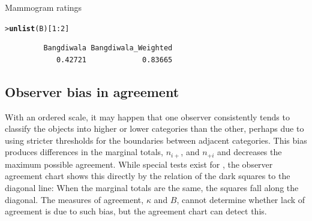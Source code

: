 \documentclass[10pt,krantz2]{krantz}\usepackage[]{graphicx}\usepackage[]{color}
\makeatletter
\newcommand{\hlnum}[1]{\textcolor[rgb]{0.686,0.059,0.569}{#1}}%
\newcommand{\hlopt}[1]{\textcolor[rgb]{0,0,0}{#1}}%
\newcommand{\hlstd}[1]{\textcolor[rgb]{0.345,0.345,0.345}{#1}}%
\newcommand{\hlkwd}[1]{\textcolor[rgb]{0.737,0.353,0.396}{\textbf{#1}}}%
\newenvironment{kframe}{%
 \def\at@end@of@kframe{}%
 \ifinner\ifhmode%
  \def\at@end@of@kframe{\end{minipage}}%
  \begin{minipage}{\columnwidth}%
 \fi\fi%
 \def\FrameCommand##1{\hskip\@totalleftmargin \hskip-\fboxsep
 \colorbox{shadecolor}{##1}\hskip-\fboxsep
     \hskip-\linewidth \hskip-\@totalleftmargin \hskip\columnwidth}%
 \MakeFramed {\advance\hsize-\width
   \@totalleftmargin\z@ \linewidth\hsize
   \@setminipage}}%
 {\par\unskip\endMakeFramed%
 \at@end@of@kframe}
\newenvironment{knitrout}{}{} %
\renewenvironment{knitrout}{\small\renewcommand{\baselinestretch}{.85}}{} %
\makeatother
\begin{document}
\begin{Example}[mammograms]{Mammogram ratings}
\begin{knitrout}
\color{fgcolor}\begin{kframe}
\begin{alltt}
\hlstd{> }\hlkwd{unlist}\hlstd{(B)[}\hlnum{1} \hlopt{:} \hlnum{2}\hlstd{]}
\end{alltt}
\begin{verbatim}
         Bangdiwala Bangdiwala_Weighted 
            0.42721             0.83665 
\end{verbatim}
\end{kframe}
\end{knitrout}
\end{Example}

\subsection{Observer bias in agreement}\label{sec:twoway-observer}
With an ordered scale, it may happen that one observer consistently
tends to classify the objects into higher or lower categories than
the other, perhaps due to using stricter thresholds for the
boundaries between adjacent categories.
This bias produces differences in the marginal totals,
\(n_{i+}\), and \(n_{+i}\) and decreases the maximum possible agreement.
While special tests exist for
, the observer agreement chart shows this
directly by the relation of the dark squares to the diagonal line:
When the marginal totals are the same, the squares fall along the
diagonal.
The measures of agreement, $\kappa$ and $B$, cannot determine
whether lack of agreement is due to such bias, but the agreement chart can
detect this.
\end{document}

